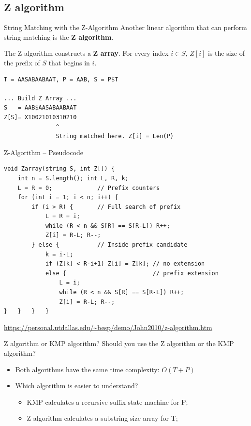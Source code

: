 \subsection{Z algorithm}

\begin{frame}[fragile]{String Matching with the Z-Algorithm}
  Another linear algorithm that can perform string matching is the {\bf Z algorithm}.\bigskip

  The Z algorithm constructs a {\bf Z array}. For every index $i\in S$, $Z[i]$ is the size of the prefix of $S$ that begins in $i$.\bigskip

\begin{verbatim}
T = AASABAABAAT, P = AAB, S = P$T

... Build Z Array ...
S   = AAB$AASABAABAAT
Z[S]= X10021010310210
               ^
               String matched here. Z[i] = Len(P)
\end{verbatim}
\end{frame}

\begin{frame}[fragile]{Z-Algorithm -- Pseudocode}
  \begin{block}{}
{\smaller
\begin{verbatim}
void Zarray(string S, int Z[]) {
    int n = S.length(); int L, R, k;
    L = R = 0;             // Prefix counters
    for (int i = 1; i < n; i++) {
        if (i > R) {       // Full search of prefix
            L = R = i;
            while (R < n && S[R] == S[R-L]) R++;
            Z[i] = R-L; R--;
        } else {           // Inside prefix candidate
            k = i-L;
            if (Z[k] < R-i+1) Z[i] = Z[k]; // no extension
            else {                         // prefix extension
                L = i;
                while (R < n && S[R] == S[R-L]) R++;
                Z[i] = R-L; R--;
}   }   }   }
\end{verbatim}}
  \end{block}

{
\url{https://personal.utdallas.edu/~besp/demo/John2010/z-algorithm.htm}}

\end{frame}

\begin{frame}{Z algorithm or KMP algorithm?}
  Should you use the Z algorithm or the KMP algorithm?\bigskip

  \begin{itemize}
    \item Both algorithms have the same time complexity: $O(T+P)$\bigskip

    \item Which algorithm is easier to understand?
    \begin{itemize}
      \item KMP calculates a recursive suffix state machine for P;
      \item Z-algorithm calculates a substring size array for T;
    \end{itemize}\bigskip
  \end{itemize}
\end{frame}



